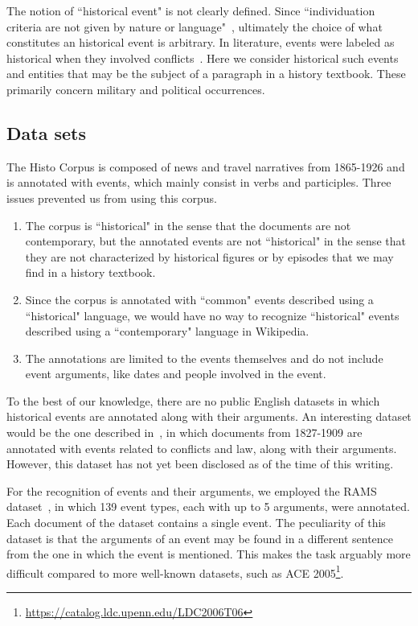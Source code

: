 \documentclass[runningheads]{llncs}
\begin{document}
The notion of “historical event" is not clearly defined. Since “individuation criteria are not given by nature or language"~\cite{shaw-2010-phdthesis}, ultimately the choice of what constitutes an historical event is arbitrary. In literature, events were labeled as historical when they involved conflicts~\cite{cybulska-vossen-2011-historical}. Here we consider historical such events and entities that may be the subject of a paragraph in a history textbook. These primarily concern military and political occurrences.

\subsection{Data sets}

The Histo Corpus is composed of news and travel narratives from 1865-1926 and is annotated with events, which mainly consist in verbs and participles. Three issues prevented us from using this corpus. 

\begin{enumerate}
    \item The corpus is “historical" in the sense that the documents are not contemporary, but the annotated events are not “historical" in the sense that they are not characterized by historical figures or by episodes that we may find in a history textbook. 
    \item Since the corpus is annotated with “common" events described using a “historical" language, we would have no way to recognize “historical" events described using a “contemporary" language in Wikipedia.
    \item The annotations are limited to the events themselves and do not include event arguments, like dates and people involved in the event.
\end{enumerate}

To the best of our knowledge, there are no public English datasets in which historical events are annotated along with their arguments. An interesting dataset would be the one described in~\cite{lai-etal-2021-event}, in which documents from 1827-1909 are annotated with events related to conflicts and law, along with their arguments. However, this dataset has not yet been disclosed as of the time of this writing.

For the recognition of events and their arguments, we employed the RAMS dataset~\cite{ebner-etal-2020-rams}, in which 139 event types, each with up to 5 arguments, were annotated. Each document of the dataset contains a single event. The peculiarity of this dataset is that the arguments of an event may be found in a different sentence from the one in which the event is mentioned. This makes the task arguably more difficult compared to more well-known datasets, such as ACE 2005\footnote{\url{https://catalog.ldc.upenn.edu/LDC2006T06}}.
\end{document}
